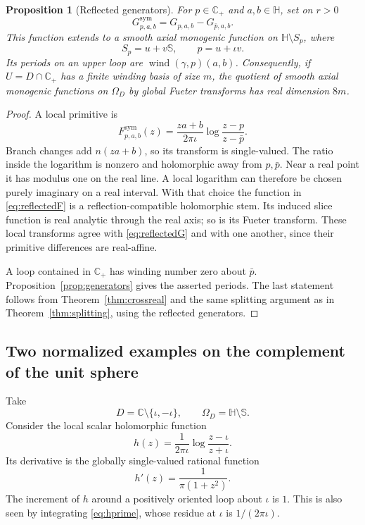 \documentclass[11pt,a4paper]{article}
\numberwithin{equation}{section}
\newtheorem{proposition}[theorem]{Proposition}
\theoremstyle{definition}
\theoremstyle{remark}
\newcommand{\C}{\mathbb C}
\newcommand{\HH}{\mathbb H}
\newcommand{\SSS}{\mathbb S}
\newcommand{\Cp}{\C_+}
\newcommand{\wind}{\operatorname{wind}}
\begin{document}
\begin{proposition}[Reflected generators]
\label{prop:reflected}
For $p\in\Cp$ and $a,b\in\HH$, set on $r>0$
\begin{equation}
 G^{\mathrm{sym}}_{p,a,b}=G_{p,a,b}-G_{\bar p,a,b}.
 \label{eq:reflectedG}
\end{equation}
This function extends to a smooth axial monogenic function on
$\HH\setminus S_p$, where
\[
 S_p=u+v\SSS,\qquad p=u+\iota v.
\]
Its periods on an upper loop are
$\wind(\gamma,p)(a,b)$. Consequently, if $U=D\cap\Cp$ has a finite
winding basis of size $m$, the quotient of smooth axial monogenic functions
on $\Omega_D$ by global Fueter transforms has real dimension $8m$.
\end{proposition}
\begin{proof}
A local primitive is
\begin{equation}
 F^{\mathrm{sym}}_{p,a,b}(z)
  =\frac{za+b}{2\pi\iota}
       \log\frac{z-p}{z-\bar p}.
 \label{eq:reflectedF}
\end{equation}
Branch changes add $n(za+b)$, so its transform is single-valued. The ratio
inside the logarithm is nonzero and holomorphic away from $p,\bar p$.
Near a real point it has modulus one on the real line. A local logarithm
can therefore be chosen purely imaginary on a real interval. With that
choice the function in \eqref{eq:reflectedF} is a reflection-compatible
holomorphic stem. Its induced slice function is real analytic through the
real axis; so is its Fueter transform. These local transforms agree with
\eqref{eq:reflectedG} and with one another, since their primitive differences
are real-affine.

A loop contained in $\Cp$ has winding number zero about $\bar p$.
Proposition~\ref{prop:generators} gives the asserted periods. The last
statement follows from Theorem~\ref{thm:crossreal} and the same splitting
argument as in Theorem~\ref{thm:splitting}, using the reflected generators.
\end{proof}

\subsection{Two normalized examples on the complement of the unit sphere}
\label{subsec:counterexample}
Take
\[
 D=\C\setminus\{\iota,-\iota\},\qquad
 \Omega_D=\HH\setminus\SSS.
\]
Consider the local scalar holomorphic function
\begin{equation}
 h(z)=\frac{1}{2\pi\iota}\log\frac{z-\iota}{z+\iota}.
 \label{eq:hcounter}
\end{equation}
Its derivative is the globally single-valued rational function
\begin{equation}
 h'(z)=\frac1{\pi(1+z^2)}.
 \label{eq:hprime}
\end{equation}
The increment of $h$ around a positively oriented loop about $\iota$ is
$1$. This is also seen by integrating \eqref{eq:hprime}, whose residue at
$\iota$ is $1/(2\pi\iota)$.
\end{document}
